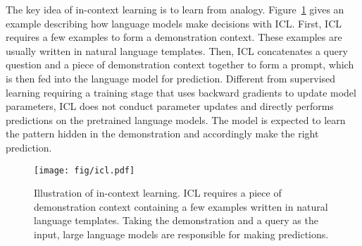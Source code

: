 The key idea of in-context learning is to learn from analogy. Figure~\ref{fig:icl} gives an example describing how language models make decisions with ICL.  %
First, ICL requires a few examples to form a demonstration context. These examples are usually written in natural language templates. 
Then, ICL concatenates a query question and a piece of demonstration context together to form a prompt,  which is then fed into the language model for prediction.
Different from supervised learning requiring a training stage that uses backward gradients to update model parameters, ICL does not conduct parameter updates and directly performs predictions on the pretrained language models. The model is expected to learn the pattern hidden in the demonstration and accordingly make the right prediction. %




\begin{figure}[t]
    \centering
    \texttt{[image: fig/icl.pdf]}
    \caption{Illustration of in-context learning. ICL requires a piece of demonstration context containing a few examples written in  natural language templates. Taking the demonstration and a query as the input, large language models are responsible for making predictions.}
    \label{fig:icl}
\end{figure}


